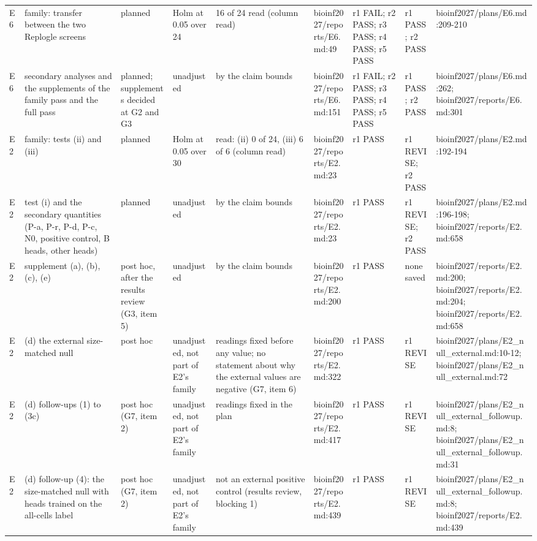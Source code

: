\begin{tabular}{lllllllll}
E6 & family: transfer between the two Replogle screens & planned & Holm at 0.05 over 24 & 16 of 24 read (column read) & bioinf2027/reports/E6.md:49 & r1 FAIL; r2 PASS; r3 PASS; r4 PASS; r5 PASS & r1 PASS; r2 PASS & bioinf2027/plans/E6.md:209-210 \\
E6 & secondary analyses and the supplements of the family pass and the full pass & planned; supplements decided at G2 and G3 & unadjusted & by the claim bounds & bioinf2027/reports/E6.md:151 & r1 FAIL; r2 PASS; r3 PASS; r4 PASS; r5 PASS & r1 PASS; r2 PASS & bioinf2027/plans/E6.md:262; bioinf2027/reports/E6.md:301 \\
E2 & family: tests (ii) and (iii) & planned & Holm at 0.05 over 30 & read: (ii) 0 of 24, (iii) 6 of 6 (column read) & bioinf2027/reports/E2.md:23 & r1 PASS & r1 REVISE; r2 PASS & bioinf2027/plans/E2.md:192-194 \\
E2 & test (i) and the secondary quantities (P-a, P-r, P-d, P-c, N0, positive control, B heads, other heads) & planned & unadjusted & by the claim bounds & bioinf2027/reports/E2.md:23 & r1 PASS & r1 REVISE; r2 PASS & bioinf2027/plans/E2.md:196-198; bioinf2027/reports/E2.md:658 \\
E2 & supplement (a), (b), (c), (e) & post hoc, after the results review (G3, item 5) & unadjusted & by the claim bounds & bioinf2027/reports/E2.md:200 & r1 PASS & none saved & bioinf2027/reports/E2.md:200; bioinf2027/reports/E2.md:204; bioinf2027/reports/E2.md:658 \\
E2 & (d) the external size-matched null & post hoc & unadjusted, not part of E2's family & readings fixed before any value; no statement about why the external values are negative (G7, item 6) & bioinf2027/reports/E2.md:322 & r1 PASS & r1 REVISE & bioinf2027/plans/E2\_null\_external.md:10-12; bioinf2027/plans/E2\_null\_external.md:72 \\
E2 & (d) follow-ups (1) to (3c) & post hoc (G7, item 2) & unadjusted, not part of E2's family & readings fixed in the plan & bioinf2027/reports/E2.md:417 & r1 PASS & r1 REVISE & bioinf2027/plans/E2\_null\_external\_followup.md:8; bioinf2027/plans/E2\_null\_external\_followup.md:31 \\
E2 & (d) follow-up (4): the size-matched null with heads trained on the all-cells label & post hoc (G7, item 2) & unadjusted, not part of E2's family & not an external positive control (results review, blocking 1) & bioinf2027/reports/E2.md:439 & r1 PASS & r1 REVISE & bioinf2027/plans/E2\_null\_external\_followup.md:8; bioinf2027/reports/E2.md:439 \\

\end{tabular}
